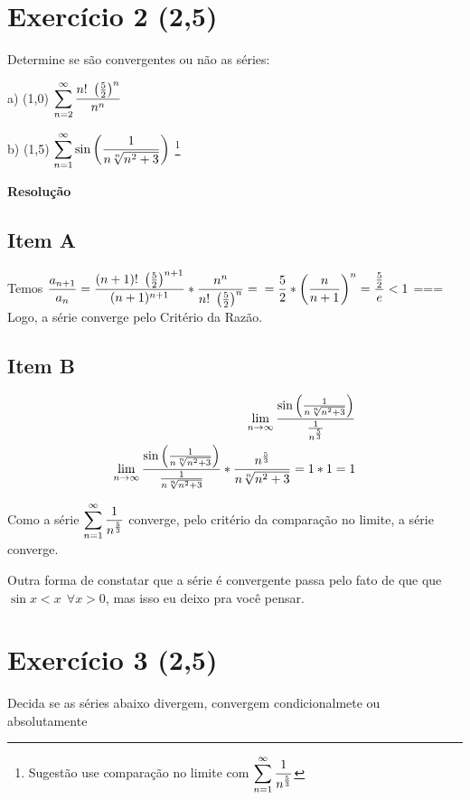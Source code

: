 \documentclass[12pt,openany, letterpaper]{book}
\newcommand{\LI}[1][n]{\lim_{{#1} \rightarrow \infty}}
\newcommand{\soma}[2][n]{\sum_{{#1} = #2}^\infty}
\newcommand{\E}[1]{Exercício #1}
\newcommand{\Resolve}{\begin{center} \textbf{Resolução} \end{center}}
\begin{document}
{{\newpage

\section*{\E{2} (2,5)} {Determine se são convergentes ou não as séries:}
\begin{multicols}{2}
a) (1,0) $\displaystyle{\soma{2} {n! \ \left({5 \over 2}\right)^n \over n^n}}$

b) (1,5) $\displaystyle{\soma{1} \sin{\left( {1 \over n \sqrt[n]{n^2 + 3}} \right)}}$ \footnote{Sugestão use comparação no limite com $\displaystyle{\soma{1} {1 \over n^{5 \over 3}}}$}
\end{multicols}

\Resolve

\begin{multicols}{2}
\subsection*{Item A}
Temos $\displaystyle{{a_{n+1} \over a_n} = {(n+1)!\ \left({5 \over 2}\right)^{n+1} \over (n+1)^{n+1}}*{n^n \over n! \ \left({5 \over 2}\right)^n}} = \\ = {5 \over 2}*\left({n \over n+1}\right)^n = {{5 \over 2} \over e} < 1$
===
Logo, a série converge pelo Critério da Razão.

\subsection*{Item B}
\begin{align*}
\LI {\sin{\left( {1 \over n \sqrt[n]{n^2 + 3}} \right)} \over {1 \over n^{5 \over 3}}} \\
\LI {\sin{\left( {1 \over n \sqrt[n]{n^2 + 3}} \right)} \over {1 \over n \sqrt[n]{n^2 + 3}}}*{n^{5 \over 3} \over n \sqrt[n]{n^2 + 3}} = 1*1 = 1 \\
\end{align*}

Como a série $\displaystyle{\soma{1} {1 \over n^{5 \over 3}}}$ converge, pelo critério da comparação no limite, a série converge.


Outra forma de constatar que a série  é convergente passa pelo fato de que que $\sin x < x \ \ \forall x > 0$, mas isso eu deixo pra você pensar.
\end{multicols}

\newpage

\section*{\E{3} (2,5)}{Decida se as séries abaixo divergem, convergem condicionalmete ou absolutamente}

}}
\end{document}
